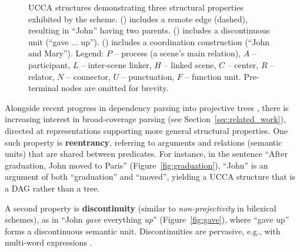 \documentclass[11pt,a4paper]{article}
\newcommand{\secref}[1]{Section~\ref{#1}}
\newcommand{\figref}[1]{Figure~\ref{#1}}
\begin{document}
\begin{figure}[t]
\begin{subfigure}[t]{.9\columnwidth}
  \hspace{.1\columnwidth}
  \parbox{.7\columnwidth}{
  }
  \end{subfigure}
  \caption{\label{fig:examples}
    UCCA structures demonstrating three structural properties exhibited by
    the scheme.
    () includes a remote edge (dashed),
    resulting in ``John'' having two parents.
    () includes a discontinuous unit (``gave ... up'').
    () includes a coordination construction (``John and Mary'').
    Legend: $P$ -- process (a scene's main relation), $A$ -- participant,
    $L$ -- inter-scene linker, $H$ -- linked scene, $C$ -- center,
    $R$ -- relator, $N$ -- connector, $U$ -- punctuation, $F$ -- function unit.
    Pre-terminal nodes are omitted for brevity.
  }
\end{figure}

Alongside recent progress in dependency parsing into projective trees
\cite{dyer2015transition,andor2016globally,kiperwasser2016simple},
there is increasing interest in broad-coverage parsing
(see \secref{sec:related_work}),
directed at representations supporting more general structural properties.
One such property is \textbf{reentrancy},
referring to arguments and relations (semantic units) that are shared between predicates.
For instance, in the sentence
``After graduation, John moved to Paris'' (\figref{fig:graduation}),
``John'' is an argument of both ``graduation''
and ``moved'', yielding a UCCA structure that is a DAG rather than a tree.

A second property is \textbf{discontinuity} (similar to \textit{non-projectivity} in bilexical schemes), as in ``John \textit{gave} everything \textit{up}''
(\figref{fig:gave}), where ``gave up'' forms a discontinuous semantic unit.
Discontinuities are pervasive, e.g.,  with multi-word
expressions \cite{schneider2014discriminative}.
\end{document}
